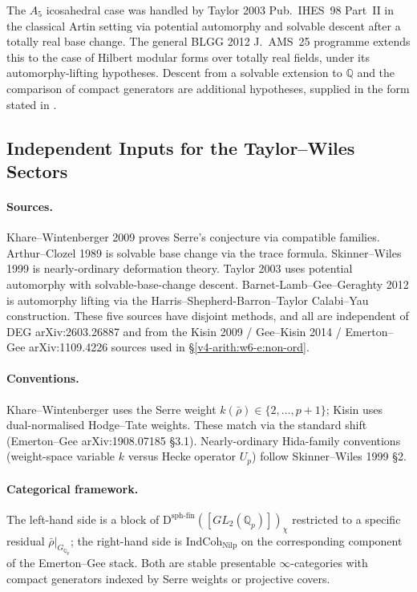 \begin{remark}
\label{v4-arith:w6-e:rem:ns-residual-domain}
The \(A_{5}\) icosahedral case was handled by Taylor 2003 Pub.~IHES~98
Part~II in the classical Artin setting via potential automorphy and
solvable descent after a totally real base change. The general
BLGG 2012 J.~AMS~25 programme extends this to the case of Hilbert
modular forms over totally real fields, under its automorphy-lifting
hypotheses. Descent from a solvable extension to \(\mathbb{Q}\) and the
comparison of compact generators are additional hypotheses, supplied in
the form stated in .
\end{remark}

\subsection{Independent Inputs for the Taylor--Wiles Sectors}

\paragraph{Sources.} Khare--Wintenberger 2009 proves
Serre's conjecture via compatible families. Arthur--Clozel 1989 is
solvable base change via the trace formula. Skinner--Wiles 1999 is
nearly-ordinary deformation theory. Taylor 2003 uses potential
automorphy with solvable-base-change descent. Barnet-Lamb--Gee--Geraghty 2012
is automorphy lifting via the Harris--Shepherd-Barron--Taylor
Calabi--Yau construction. These five sources have disjoint methods, and
all are independent of DEG arXiv:2603.26887 and
from the Kisin 2009 / Gee--Kisin 2014 / Emerton--Gee arXiv:1109.4226
sources used in \S\ref{v4-arith:w6-e:non-ord}.

\paragraph{Conventions.} Khare--Wintenberger uses the Serre weight
\(k(\bar\rho)\in\{2,\ldots,p+1\}\); Kisin uses dual-normalised
Hodge--Tate weights. These match via the standard shift
(Emerton--Gee arXiv:1908.07185 \S 3.1). Nearly-ordinary Hida-family
conventions (weight-space variable \(k\) versus Hecke operator
\(U_{p}\)) follow Skinner--Wiles 1999 \S 2.

\paragraph{Categorical framework.} The left-hand side is a block of
\(\mathrm{D}^{\mathrm{sph\text{-}fin}}([GL_{2}(\mathbb{Q}_{p})])_{\chi}\)
restricted to a specific residual \(\bar\rho|_{G_{\mathbb{Q}_{p}}}\);
the right-hand side is \(\mathrm{IndCoh}_{\mathrm{Nilp}}\) on the
corresponding component of the Emerton--Gee stack. Both are stable
presentable \(\infty\)-categories with compact generators indexed by
Serre weights or projective covers.

